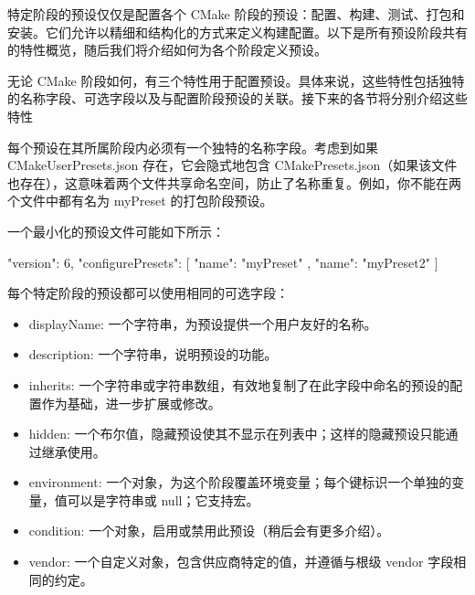 

特定阶段的预设仅仅是配置各个 CMake 阶段的预设：配置、构建、测试、打包和安装。它们允许以精细和结构化的方式来定义构建配置。以下是所有预设阶段共有的特性概览，随后我们将介绍如何为各个阶段定义预设。


无论 CMake 阶段如何，有三个特性用于配置预设。具体来说，这些特性包括独特的名称字段、可选字段以及与配置阶段预设的关联。接下来的各节将分别介绍这些特性



每个预设在其所属阶段内必须有一个独特的名称字段。考虑到如果 CMakeUserPresets.json 存在，它会隐式地包含 CMakePresets.json（如果该文件也存在），这意味着两个文件共享命名空间，防止了名称重复。例如，你不能在两个文件中都有名为 myPreset 的打包阶段预设。

一个最小化的预设文件可能如下所示：

\begin{json}
{
    "version": 6,
    "configurePresets": [
    {
        "name": "myPreset"
    },
    {
        "name": "myPreset2"
    }
    ]
}
\end{json}



每个特定阶段的预设都可以使用相同的可选字段：

\begin{itemize}
\item
displayName: 一个字符串，为预设提供一个用户友好的名称。

\item
description: 一个字符串，说明预设的功能。

\item
inherits: 一个字符串或字符串数组，有效地复制了在此字段中命名的预设的配置作为基础，进一步扩展或修改。

\item
hidden: 一个布尔值，隐藏预设使其不显示在列表中；这样的隐藏预设只能通过继承使用。

\item
environment: 一个对象，为这个阶段覆盖环境变量；每个键标识一个单独的变量，值可以是字符串或 null；它支持宏。

\item
condition: 一个对象，启用或禁用此预设（稍后会有更多介绍）。

\item
vendor: 一个自定义对象，包含供应商特定的值，并遵循与根级 vendor 字段相同的约定。
\end{itemize}

